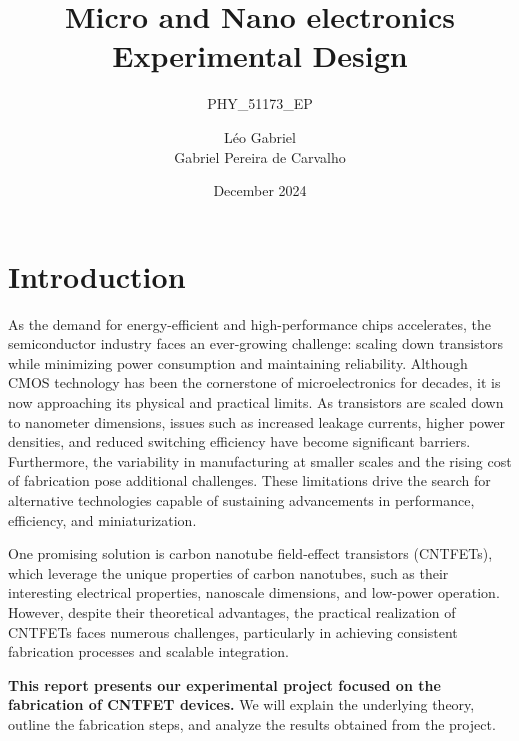 \documentclass[a4paper,12pt,twoside]{article}
\title{Micro and Nano electronics Experimental Design}
\subtitle{PHY\_51173\_EP}
\author{Léo Gabriel \\
Gabriel Pereira de Carvalho}
\date{December 2024}
\begin{document}
\maketitle

\section*{Introduction}
As the demand for energy-efficient and high-performance chips accelerates, the semiconductor industry faces an ever-growing challenge: scaling down transistors while minimizing power consumption and maintaining reliability. 
Although CMOS technology has been the cornerstone of microelectronics for decades, it is now approaching its physical and practical limits. As transistors are scaled down to nanometer dimensions, issues such as increased leakage currents, higher power densities, and reduced switching efficiency have become significant barriers. Furthermore, the variability in manufacturing at smaller scales and the rising cost of fabrication pose additional challenges. These limitations drive the search for alternative technologies capable of sustaining advancements in performance, efficiency, and miniaturization.

One promising solution is carbon nanotube field-effect transistors (CNTFETs), which leverage the unique properties of carbon nanotubes, such as their interesting electrical properties, nanoscale dimensions, and low-power operation. However, despite their theoretical advantages, the practical realization of CNTFETs faces numerous challenges, particularly in achieving consistent fabrication processes and scalable integration. 

\textbf{This report presents our experimental project focused on the fabrication of CNTFET devices.} We will explain the underlying theory, outline the fabrication steps, and analyze the results obtained from the project.
\end{document}
